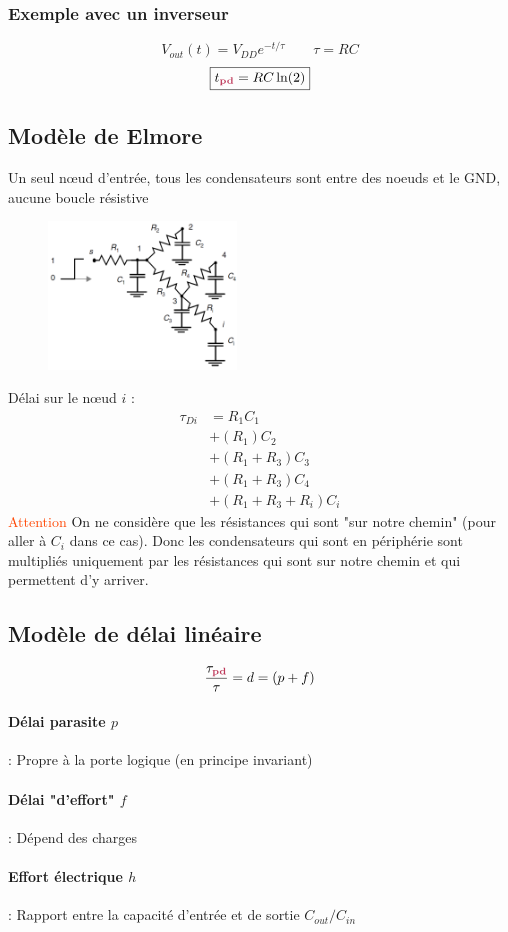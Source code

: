 \documentclass[resume]{subfiles}
\begin{document}
\begin{multicols}{3}
\subsubsection{Exemple avec un inverseur}
$$V_{out}(t)=V_{DD}e^{-t/\tau}\qquad \tau=RC$$
$$\boxed{t_{\pdelay}=RC\ln(2)}$$
\subsection{Modèle de Elmore}
Un seul nœud d'entrée, tous les condensateurs sont entre des noeuds et le GND, aucune boucle résistive
\begin{figure}[H]
\centering
\includegraphics[width=5.00cm]{img_43.png}
\end{figure}
Délai sur le nœud $i$ :
\begin{align*}
\tau_{Di}&=R_1C_1\\&+(R_1)C_2\\&+(R_1+R_3)C_3\\&+(R_1+R_3)C_4\\&+(R_1+R_3+R_i)C_i
\end{align*}
\textcolor{OrangeRed}{Attention} On ne considère que les résistances qui sont "sur notre chemin" (pour aller à $C_i$ dans ce cas). Donc les condensateurs qui sont en périphérie sont multipliés uniquement par les résistances qui sont sur notre chemin et qui permettent d'y arriver.
\subsection{Modèle de délai linéaire}
$$\frac{\tau_{\pdelay}}{\tau}=d=(p+f)$$
\paragraph{Délai parasite $p$} : Propre à la porte logique (en principe invariant)
\paragraph{Délai "d'effort" $f$} : Dépend des charges
\paragraph{Effort électrique $h$} : Rapport entre la capacité d'entrée et de sortie $C_{out} / C_{in}$


\end{multicols}
\end{document}
